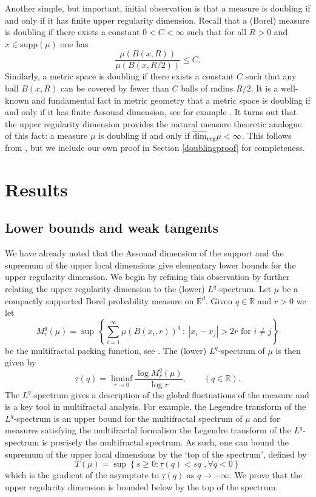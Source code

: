 \documentclass[12pt]{amsart}
\numberwithin{equation}{section}
\renewcommand{\ge}{\geqslant}
\renewcommand{\leq}{\leqslant}
\renewcommand{\r}{\overline{\dim}_{\textup{reg}} \mu}
\begin{document}
Another simple, but important, initial observation is that a measure is doubling if and only if it has finite upper regularity dimension.  Recall that  a  (Borel) measure is doubling if there exists a constant $0<C< \infty$ such that for all $R>0$ and $x\in \text{supp}(\mu)$ one has
\[
\frac{\mu(B(x,R))}{\mu(B(x,R/2))}\leq C.
\]
Similarly, a metric space is doubling if there exists a constant $C$ such that any ball $B(x,R)$ can be covered by fewer than $C$ balls of radius $R/2$.  It is a well-known and fundamental fact in metric geometry that a metric space is doubling if and only if it has finite Assouad dimension, see for example \cite[Lemma 9.4]{robinson}.  It turns out that the upper regularity dimension provides the natural measure theoretic analogue of this fact: a measure $\mu$ is doubling if and only if $\r <\infty$.  This follows from \cite[Lemma 3.2]{kaenmakinew}, but we include our own proof in Section \ref{doublingproof} for completeness.













\section{Results}   \label{results}

\subsection{Lower bounds and weak tangents}



We have already noted that the Assouad dimension of the support and the supremum of the upper local dimensions give elementary lower bounds for the upper regularity dimension.  We begin by refining this observation by further relating the upper regularity dimension to the (lower) $L^q$-spectrum.  Let $\mu$ be a compactly supported Borel probability measure on $\mathbb{R}^d$.  Given $q \in \mathbb{R}$ and $r>0$ we let
\[
M_r^q(\mu) = \sup  \, \left \{ \sum_{i=1}^\infty  \mu(B(x_i,r))^q \ : \ | x_i-x_j | > 2r \text{ for $i \neq j$} \right\}
\]
be the multifractal packing function, see \cite{olsenformalism}.  The  (lower) $L^q$-spectrum of $\mu$ is then given by
\[
\underline{\tau}(q)= \liminf_{r\rightarrow 0} \frac{\log M_r^q(\mu) }{\log r}, \qquad (q\in \mathbb{R}).
\]
The $L^q$-spectrum gives a description of the global fluctuations of the measure and is a key tool in multifractal analysis. For example, the Legendre transform of the $L^q$-spectrum is an upper bound for the multifractal spectrum of $\mu$ and for measures satisfying the multifractal formalism the Legendre transform of the $L^q$-spectrum is precisely the multifractal spectrum.  As such, one can bound the supremum of the upper local dimensions by the `top of the spectrum', defined by
\[
T(\mu)=\sup \left\{ s \ge 0 \colon \underline{\tau}(q) < sq \, \,, \forall q<0 \right\}
\]
 which is the gradient of the asymptote to $\underline{\tau}(q)$ as $q \rightarrow - \infty$.  We prove that the upper regularity dimension is bounded below by the top of the spectrum.  
\end{document}
